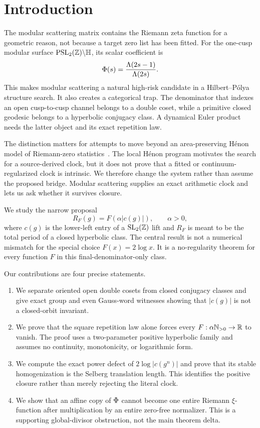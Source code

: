 \section{Introduction}

The modular scattering matrix contains the Riemann zeta function for a
geometric reason, not because a target zero list has been fitted.  For the
one-cusp modular surface $\operatorname{PSL}_2(\mathbb Z)\backslash\mathbb H$, its scalar coefficient is
\[
 \Phi(s)=\frac{\Lambda(2s-1)}{\Lambda(2s)}.
\]
This makes modular scattering a natural high-risk candidate in a
Hilbert--P\'olya structure search.  It also creates a categorical trap.  The
denominator that indexes an open cusp-to-cusp channel belongs to a double
coset, while a primitive closed geodesic belongs to a hyperbolic conjugacy
class.  A dynamical Euler product needs the latter object and its exact
repetition law.

The distinction matters for attempts to move beyond an area-preserving
H\'enon model of Riemann-zero statistics~\cite{Wang2026Henon}.  The local
H\'enon program motivates the search for a source-derived clock, but it does
not prove that a fitted or continuum-regularized clock is intrinsic.  We
therefore change the system rather than assume the proposed bridge.  Modular
scattering supplies an exact arithmetic clock and lets us ask whether it
survives closure.

We study the narrow proposal
\[
  R_F(g)=F(\alpha|c(g)|),\qquad \alpha>0,
\]
where $c(g)$ is the lower-left entry of a $\operatorname{SL}_2(\mathbb Z)$ lift and $R_F$ is meant
to be the total period of a closed hyperbolic class.  The central result is
not a numerical mismatch for the special choice $F(x)=2\log x$.  It is a
no-regularity theorem for every function $F$ in this final-denominator-only
class.

Our contributions are four precise statements.

\begin{enumerate}
\item We separate oriented open double cosets from closed conjugacy classes
and give exact group and even Gauss-word witnesses showing that $|c(g)|$ is
not a closed-orbit invariant.
\item We prove that the square repetition law alone forces every
$F:\alpha\mathbb N_{>0}\to\mathbb R$ to vanish.  The proof uses a two-parameter positive
hyperbolic family and assumes no continuity, monotonicity, or logarithmic
form.
\item We compute the exact power defect of $2\log|c(g^n)|$ and prove that its
stable homogenization is the Selberg translation length.  This identifies the
positive closure rather than merely rejecting the literal clock.
\item We show that an affine copy of $\Phi$ cannot become one entire
Riemann $\xi$-function after multiplication by an entire zero-free
normalizer.  This is a supporting global-divisor obstruction, not the main
theorem delta.
\end{enumerate}

